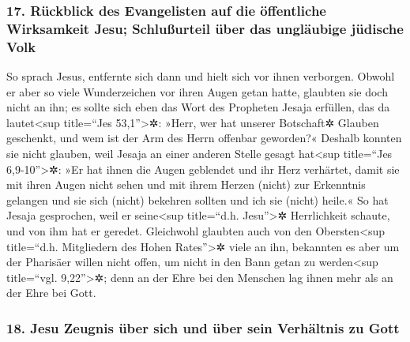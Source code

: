 \hypertarget{ruxfcckblick-des-evangelisten-auf-die-uxf6ffentliche-wirksamkeit-jesu-schluuxdfurteil-uxfcber-das-ungluxe4ubige-juxfcdische-volk}{%
\subsubsection{17. Rückblick des Evangelisten auf die öffentliche
Wirksamkeit Jesu; Schlußurteil über das ungläubige jüdische
Volk}\label{ruxfcckblick-des-evangelisten-auf-die-uxf6ffentliche-wirksamkeit-jesu-schluuxdfurteil-uxfcber-das-ungluxe4ubige-juxfcdische-volk}}

So sprach Jesus, entfernte sich dann und hielt sich vor ihnen verborgen.
 Obwohl er aber so viele Wunderzeichen vor ihren Augen
getan hatte, glaubten sie doch nicht an ihn;  es sollte
sich eben das Wort des Propheten Jesaja erfüllen, das da
lautet\textless sup title=``Jes 53,1''\textgreater✲: »Herr, wer hat
unserer Botschaft✲ Glauben geschenkt, und wem ist der Arm des Herrn
offenbar geworden?«  Deshalb konnten sie nicht glauben,
weil Jesaja an einer anderen Stelle gesagt hat\textless sup title=``Jes
6,9-10''\textgreater✲:  »Er hat ihnen die Augen geblendet
und ihr Herz verhärtet, damit sie mit ihren Augen nicht sehen und mit
ihrem Herzen (nicht) zur Erkenntnis gelangen und sie sich (nicht)
bekehren sollten und ich sie (nicht) heile.«  So hat
Jesaja gesprochen, weil er seine\textless sup title=``d.h.
Jesu''\textgreater✲ Herrlichkeit schaute, und von ihm hat er geredet.
 Gleichwohl glaubten auch von den Obersten\textless sup
title=``d.h. Mitgliedern des Hohen Rates''\textgreater✲ viele an ihn,
bekannten es aber um der Pharisäer willen nicht offen, um nicht in den
Bann getan zu werden\textless sup title=``vgl. 9,22''\textgreater✲;
 denn an der Ehre bei den Menschen lag ihnen mehr als an
der Ehre bei Gott.

\hypertarget{jesu-zeugnis-uxfcber-sich-und-uxfcber-sein-verhuxe4ltnis-zu-gott}{%
\subsubsection{18. Jesu Zeugnis über sich und über sein Verhältnis zu
Gott}\label{jesu-zeugnis-uxfcber-sich-und-uxfcber-sein-verhuxe4ltnis-zu-gott}}

